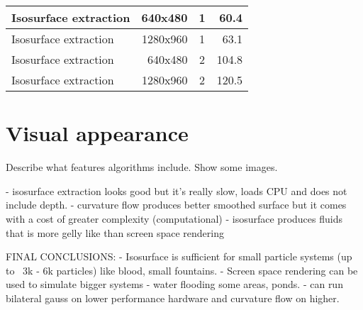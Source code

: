\begin{table}
\begin{tabular} { l | r | c | r }
      Isosurface extraction                    &          640x480                &              1                  &            60.4                    \\ \hline     
      Isosurface extraction                    &          1280x960               &              1                  &           63.1                   \\ \hline      
      Isosurface extraction                    &          640x480                &              2                  &            104.8               \\ \hline
      Isosurface extraction                    &          1280x960               &              2                  &           120.5               \\ 
   \end{tabular}
\end{table}



\section{Visual appearance}

Describe what features algorithms include. Show some images. 

- isosurface extraction looks good but it's really slow, loads CPU and does not include depth.
- curvature flow produces better smoothed surface but it comes with a cost of greater complexity (computational)
- isosurface produces fluids that is more gelly like than screen space rendering


FINAL CONCLUSIONS:
- Isosurface is sufficient for small particle systems (up to ~3k - 6k particles) like blood, small fountains.
- Screen space rendering can be used to simulate bigger systems - water flooding some areas, ponds. 
   - can run bilateral gauss on lower performance hardware and curvature flow on higher.





